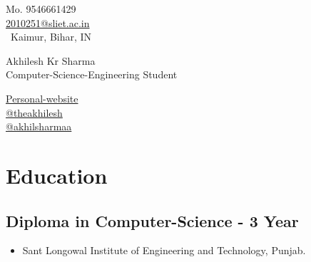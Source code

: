 \documentclass[a4,11pt]{article}
\newenvironment{zitemize}{
\begin{itemize}\itemsep0pt \parskip0pt \parsep1pt}
{\end{itemize}\vspace{-0.5cm}}
\begin{document}
\begin{center}
    \begin{minipage}[b]{0.25\textwidth}
            \flushleft \large  %
            \large \color{UI_blue} Mo. 9546661429 \\
            \large \href{mailto:2010251@sliet.ac.in}{2010251@sliet.ac.in}  \\
            \large \faMapMarker\ Kaimur, Bihar, IN \\
    \end{minipage}%
    \begin{minipage}[b]{0.5\textwidth}
            \centering
            {\HUGE Akhilesh Kr Sharma} \\ 
            \vspace{0.1cm}
            {\large Computer-Science-Engineering Student } \\
    \end{minipage}%
    \begin{minipage}[b]{0.25\textwidth}
            \flushright \large  %
            {\href{https://akhilsharmaa.github.io/profile}
            {\color{UI_blue} Personal-website} \color{black}{\faGlobe}} \\
            {\href{https://www.linkedin.com/in/theakhilesh/}
            {\color{UI_blue} @theakhilesh} \faLinkedin } \\
            {\href{https://www.github.com/akhilsharmaa/}
            { \color{UI_blue}@akhilsharmaa} \faGithub } \\
    \end{minipage}   
\end{center}

\vspace{-0.7cm}
\section{Education}

\subsection{\large Diploma in Computer-Science - 3 Year
\hfill {} }
\begin{zitemize}
    \setlength\itemsep{-0.1em}
        \item Sant Longowal Institute of Engineering and Technology, Punjab.
        \hfill {}
    \end{zitemize}
\vspace{-0.3cm}
\end{document}
